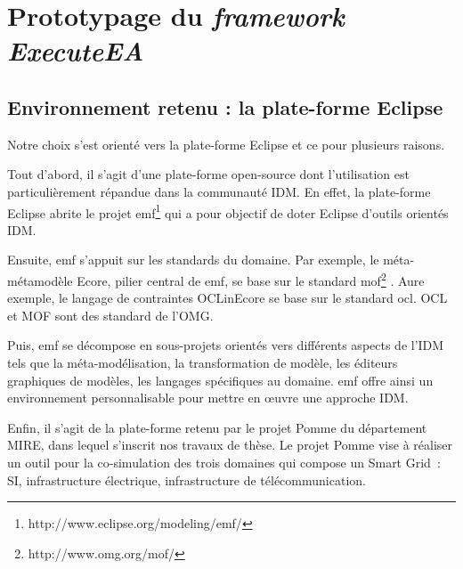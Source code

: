 \chapter{Prototypage du \emph{framework ExecuteEA}}
\label{ch:implem}

\PartialToc

%

\section{Environnement retenu : la plate-forme Eclipse}

Notre choix s'est orienté vers la plate-forme Eclipse et ce pour plusieurs raisons.

Tout d'abord, il s'agit d'une plate-forme open-source dont l'utilisation est particulièrement répandue dans la communauté IDM.
En effet, la plate-forme Eclipse abrite le projet \gls{emf}\footnote{http://www.eclipse.org/modeling/emf/} qui a pour objectif de doter Eclipse d'outils orientés IDM. 

Ensuite, \gls{emf} s'appuit sur les standards du domaine. Par exemple, le méta-métamodèle Ecore, pilier central de \gls{emf}, se base sur le standard \gls{mof}\footnote{http://www.omg.org/mof/} . Aure exemple, le langage de contraintes OCLinEcore se base sur le standard \gls{ocl}.
OCL et MOF sont des standard de l'OMG.

Puis, \gls{emf} se décompose en sous-projets orientés vers différents aspects de l'IDM tels que la méta-modélisation, la transformation de modèle, les éditeurs graphiques de modèles, les langages spécifiques au domaine. \gls{emf} offre ainsi un environnement personnalisable pour mettre en œuvre une approche IDM.

Enfin, il s'agit de la plate-forme retenu par le projet Pomme du département MIRE, dans lequel s'inscrit nos travaux de thèse. Le projet Pomme vise à réaliser un outil pour la co-simulation des trois domaines qui compose un Smart Grid~: SI, infrastructure électrique, infrastructure de télécommunication. 

